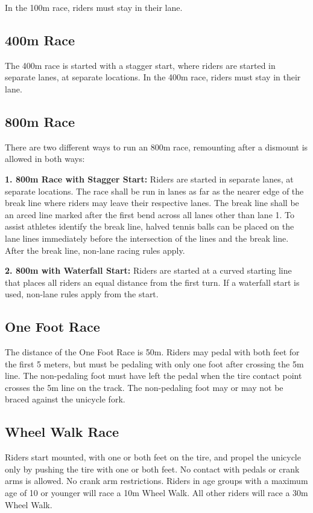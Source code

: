 In the 100m race, riders must stay in their lane.

\subsection{400m Race}

The 400m race is started with a stagger start, where riders are started in separate lanes, at separate locations.
In the 400m race, riders must stay in their lane.

\subsection{800m Race}

There are two different ways to run an 800m race, remounting after a dismount is allowed in both ways:

\textbf{1. 800m Race with Stagger Start:} Riders are started in separate lanes, at separate locations.
The race shall be run in lanes as far as the nearer edge of the break line where riders may leave their respective lanes.
The break line shall be an arced line marked after the first bend across all lanes other than lane 1.
To assist athletes identify the break line, halved tennis balls can be placed on the lane lines immediately before the intersection of the lines and the break line.
After the break line, non-lane racing rules apply.

\textbf{2. 800m with Waterfall Start:} Riders are started at a curved starting line that places all riders an equal distance from the first turn.
If a waterfall start is used, non-lane rules apply from the start.

\subsection{One Foot Race}
The distance of the One Foot Race is 50m.
Riders may pedal with both feet for the first 5 meters, but must be pedaling with only one foot after crossing the 5m line.
The non-pedaling foot must have left the pedal when the tire contact point crosses the 5m line on the track.
The non-pedaling foot may or may not be braced against the unicycle fork.

\subsection{Wheel Walk Race}

Riders start mounted, with one or both feet on the tire, and propel the unicycle only by pushing the tire with one or both feet.
No contact with pedals or crank arms is allowed.
No crank arm restrictions.
Riders in age groups with a maximum age of 10 or younger will race a 10m Wheel Walk.
All other riders will race a 30m Wheel Walk.

